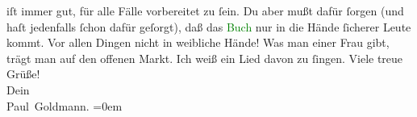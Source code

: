                iſt immer gut, für alle Fälle  vorbereitet zu ſein.
               Du aber mußt dafür ſorgen (und haſt jedenfalls ſchon dafür geſorgt), daß das \textcolor{green}{Buch}{}\ledrightnote{{$\rightarrow$}\textcolor{green}{Reigen. Zehn Dialoge}} nur in die Hände ſicherer
               Leute kommt. Vor allen  Dingen nicht in weibliche
               Hände! Was man einer Frau gibt, trägt man auf den offenen Markt. Ich weiß ein Lied
               davon zu ſingen. \pend
           \pstart
           Viele treue Grüße! {\\[\baselineskip]}Dein {\\[\baselineskip]}\spacefill\mbox{Paul Goldmann.}\pend
           \leftskip=0em{}\endnumbering{}\begin{anhang}\end{anhang}
      